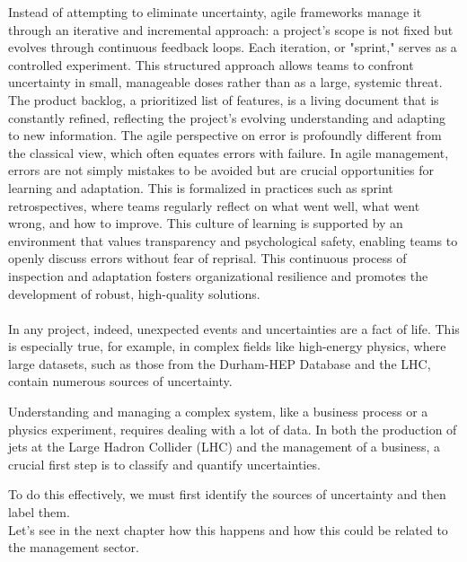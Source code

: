 \documentclass{article}
\begin{document}
Instead of attempting to eliminate uncertainty, agile frameworks manage it through an iterative and incremental approach: a project’s scope is not fixed but evolves through continuous feedback loops. Each iteration, or "sprint," serves as a controlled experiment. This structured approach allows teams to confront uncertainty in small, manageable doses rather than as a large, systemic threat. The product backlog, a prioritized list of features, is a living document that is constantly refined, reflecting the project’s evolving understanding and adapting to new information. The agile perspective on error is profoundly different from the classical view, which often equates errors with failure. In agile management, errors are not simply mistakes to be avoided but are crucial opportunities for learning and adaptation. This is formalized in practices such as sprint retrospectives, where teams regularly reflect on what went well, what went wrong, and how to improve. This culture of learning is supported by an environment that values transparency and psychological safety, enabling teams to openly discuss errors without fear of reprisal. This continuous process of inspection and adaptation fosters organizational resilience and promotes the development of robust, high-quality solutions.\\\\
In any project, indeed, unexpected events and uncertainties are a fact of life. This is especially true, for example, in complex fields like high-energy physics, where large datasets, such as those from the Durham-HEP Database and the LHC, contain numerous sources of uncertainty.  

Understanding and managing a complex system, like a business process or a physics experiment, requires dealing with a lot of data. In both the production of jets at the Large Hadron Collider (LHC) and the management of a business, a crucial first step is to classify and quantify uncertainties.

To do this effectively, we must first identify the sources of uncertainty and then label them.\\
Let's see in the next chapter how this happens and how this could be related to the management sector.
\end{document}
